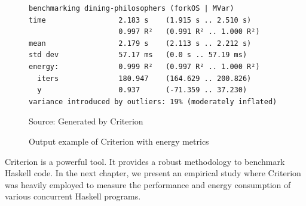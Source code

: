 \begin{figure}[htp]
  \centering
  \caption{Output example of Criterion with energy metrics}
	\begin{verbatim}
benchmarking dining-philosophers (forkOS | MVar)
time                 2.183 s    (1.915 s .. 2.510 s)
                     0.997 R²   (0.991 R² .. 1.000 R²)
mean                 2.179 s    (2.113 s .. 2.212 s)
std dev              57.17 ms   (0.0 s .. 57.19 ms)
energy:              0.999 R²   (0.997 R² .. 1.000 R²)
  iters              180.947    (164.629 .. 200.826)
  y                  0.937      (-71.359 .. 37.230)
variance introduced by outliers: 19% (moderately inflated)
  \end{verbatim}
  \footnotesize{Source: Generated by Criterion}
  \label{fig:fib-energy-output}
\end{figure}

Criterion is a powerful tool. It provides a robust methodology to benchmark Haskell code. In the next chapter, we present an empirical study where Criterion was heavily employed to measure the performance and energy consumption of various concurrent Haskell programs.
